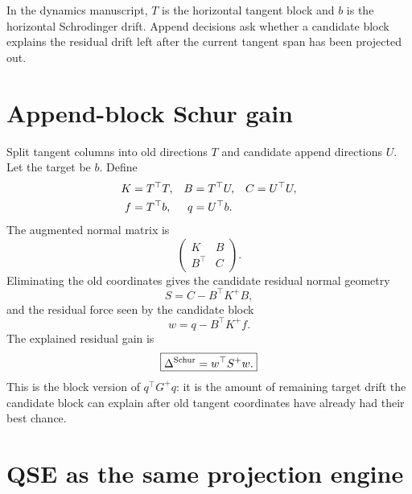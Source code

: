 \documentclass[10pt,twocolumn]{article}
\begin{document}
\begin{paperbox}
In the dynamics manuscript, $T$ is the horizontal tangent block and $b$ is the horizontal Schrodinger drift. Append decisions ask whether a candidate block explains the residual drift left after the current tangent span has been projected out.
\end{paperbox}

\section{Append-block Schur gain}

Split tangent columns into old directions $T$ and candidate append directions $U$. Let the target be $b$. Define
\begin{align}
K&=T^\top T,&
B&=T^\top U,&
C&=U^\top U,\notag\\
f&=T^\top b,&
q&=U^\top b.
\label{eq:append_blocks}
\end{align}
The augmented normal matrix is
\begin{equation}
\begin{pmatrix}
K&B\\B^\top&C
\end{pmatrix}.
\label{eq:augmented_normal}
\end{equation}
Eliminating the old coordinates gives the candidate residual normal geometry
\begin{equation}
S=C-B^\top K^+B,
\label{eq:append_schur_block}
\end{equation}
and the residual force seen by the candidate block
\begin{equation}
w=q-B^\top K^+f.
\label{eq:append_residual_force}
\end{equation}
The explained residual gain is
\begin{equation}
\boxed{\Delta^{\rm Schur}=w^\top S^+w.}
\label{eq:append_schur_gain}
\end{equation}
This is the block version of $q^\top G^+q$: it is the amount of remaining target drift the candidate block can explain after old tangent coordinates have already had their best chance.


\section{QSE as the same projection engine}
\end{document}
